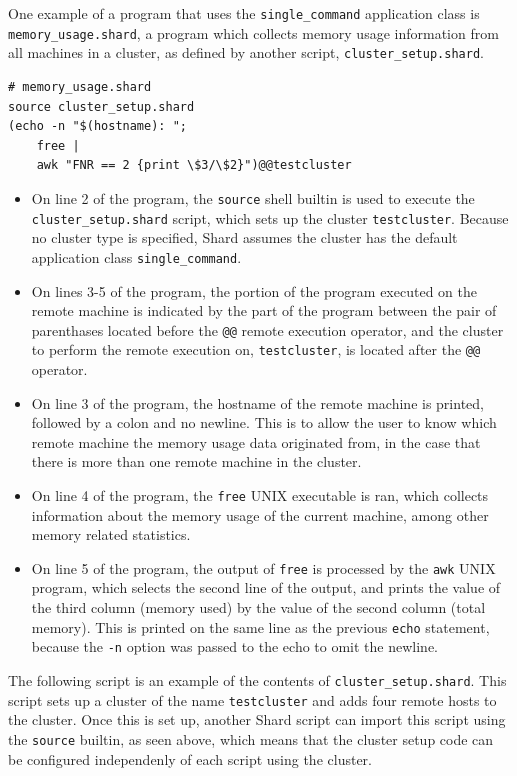 \documentclass[twoside]{report}
\begin{document}
One example of a program that uses the \texttt{single\_command} application class is \texttt{memory\_usage.shard}, a program which collects memory usage information from all machines in a cluster, as defined by another script, \texttt{cluster\_setup.shard}.

\begin{lstlisting}[language=Shard]
# memory_usage.shard
source cluster_setup.shard
(echo -n "$(hostname): ";
    free |
    awk "FNR == 2 {print \$3/\$2}")@@testcluster
\end{lstlisting}

\begin{itemize}
  \item On line 2 of the program, the \texttt{source} shell builtin is used to execute the \texttt{cluster\_setup.shard} script, which sets up the cluster \texttt{testcluster}.
        Because no cluster type is specified, Shard assumes the cluster has the default application class \texttt{single\_command}.
  \item On lines 3-5 of the program, the portion of the program executed on the remote machine is indicated by the part of the program between the pair of parenthases located before the \texttt{@@} remote execution operator, and the cluster to perform the remote execution on, \texttt{testcluster}, is located after the \texttt{@@} operator.
  \item On line 3 of the program, the hostname of the remote machine is printed, followed by a colon and no newline. This is to allow the user to know which remote machine the memory usage data originated from, in the case that there is more than one remote machine in the cluster.
  \item On line 4 of the program, the \texttt{free} UNIX executable is ran, which collects information about the memory usage of the current machine, among other memory related statistics.
  \item On line 5 of the program, the output of \texttt{free} is processed by the \texttt{awk} UNIX program, which selects the second line of the output, and prints the value of the third column (memory used) by the value of the second column (total memory). This is printed on the same line as the previous \texttt{echo} statement, because the \texttt{-n} option was passed to the echo to omit the newline.
\end{itemize}

The following script is an example of the contents of \texttt{cluster\_setup.shard}.
This script sets up a cluster of the name \texttt{testcluster} and adds four remote hosts to the cluster.
Once this is set up, another Shard script can import this script using the \texttt{source} builtin, as seen above, which means that the cluster setup code can be configured independenly of each script using the cluster.
\end{document}
